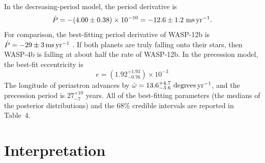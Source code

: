 \documentclass[12pt,twocolumn,tighten]{aastex62}
\begin{document}
In the decreasing-period model, the period derivative is
\begin{equation}
\dot{P}
  = - (4.00 \pm 0.38)\times 10^{-10}
  = - 12.6 \pm 1.2~{\rm ms}\,{\rm yr}^{-1}.
  \label{eq:dP_dt_obs}
\end{equation}
For comparison, the best-fitting period derivative of WASP-12b is
$\dot{P} = -29 \pm 3\,{\rm ms}\,{\rm yr}^{-1}$
\citep{maciejewski_departure_2016,patra_2017}.  If both planets are
truly falling onto their stars, then WASP-4b is falling at about half
the rate of WASP-12b.  In the precession model, the best-fit
eccentricity is
\begin{equation}
  e = (1.92^{+ 1.93}_{- 0.76})\times10^{-3}
\end{equation}
The longitude of periastron advances by $\dot{\omega} =
13.6^{+4.7}_{-3.6}\ {\rm degrees}\,{\rm yr}^{-1}$, and the precession
period is $27^{+10}_{-7}$ years.  All of the best-fitting parameters
(the medians of the posterior distributions) and the 68\% credible
intervals are reported in Table~4.


\section{Interpretation}
\label{sec:implications}
\end{document}
